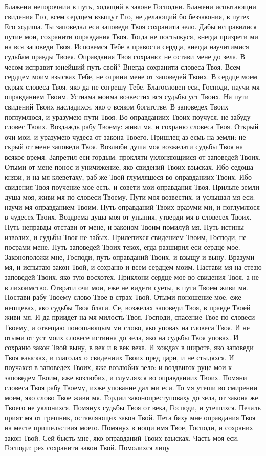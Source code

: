 \begin{mymulticols}
Блажени непорочнии в путь, ходящий в законе Господни. Блажени испытающии свидения Его, всем сердцем взыщут Его, не делающий бо беззакония, в путех Его ходиша. Ты заповедал еси заповеди Твоя сохранити зело. Дабы исправилися путие мои, сохранити оправдания Твоя. Тогда не постыжуся, внегда призрети ми на вся заповеди Твоя. Исповемся Тебе в правости сердца, внегда научитимися судьбам правды Твоея. Оправдания Твоя сохраню: не остави мене до зела. В чесом исправит юнейший путь свой? Внегда сохранити словеса Твоя. Всем сердцем моим взысках Тебе, не отрини мене от заповедей Твоих. В сердце моем скрых словеса Твоя, яко да не согрешу Тебе. Благословен еси, Господи, научи мя оправданием Твоим. Устнама моима возвестих вся судьбы уст Твоих. На пути свидений Твоих насладихся, яко о всяком богатстве. В заповедех Твоих поглумлюся, и уразумею пути Твоя. Во оправданиих Твоих поучуся, не забуду словес Твоих. Воздаждь рабу Твоему: живи мя, и сохраню словеса Твоя. Открый очи мои, и уразумею чудеса от закона Твоего. Пришлец аз есмь на земли: не скрый от мене заповеди Твоя. Возлюби душа моя возжелати судьбы Твоя на всякое время. Запретил еси гордым: прокляти уклоняющиися от заповедей Твоих. Отыми от мене понос и уничижение, яко свидений Твоих взысках. Ибо седоша князи, и на мя клеветаху, раб же Твой глумляшеся во оправданиих Твоих. Ибо свидения Твоя поучение мое есть, и совети мои оправдания Твоя. Прильпе земли душа моя, живи мя по словеси Твоему. Пути моя возвестих, и услышал мя еси: научи мя оправданием Твоим. Путь оправданий Твоих вразуми ми, и поглумлюся в чудесех Твоих. Воздрема душа моя от уныния, утверди мя в словесех Твоих. Путь неправды отстави от мене, и законом Твоим помилуй мя. Путь истины изволих, и судьбы Твоя не забых. Прилепихся свидением Твоим, Господи, не посрами мене. Путь заповедей Твоих текох, егда разширил еси сердце мое. Законоположи мне, Господи, путь оправданий Твоих, и взыщу и выну. Вразуми мя, и испытаю закон Твой, и сохраню и всем сердцем моим. Настави мя на стезю заповедей Твоих, яко тую восхотех. Приклони сердце мое во свидения Твоя, а не в лихоимство. Отврати очи мои, еже не видети суеты, в пути Твоем живи мя. Постави рабу Твоему слово Твое в страх Твой. Отыми поношение мое, еже непщевах, яко судьбы Твоя благи. Се, возжелах заповеди Твоя, в правде Твоей живи мя. И да приидет на мя милость Твоя, Господи, спасение Твое по словеси Твоему, и отвещаю поношающым ми слово, яко уповах на словеса Твоя. И не отыми от уст моих словесе истинна до зела, яко на судьбы Твоя уповах. И сохраню закон Твой выну, в век и в век века. И хождах в широте, яко заповеди Твоя взысках, и глаголах о свидениих Твоих пред цари, и не стыдяхся. И поучахся в заповедех Твоих, яже возлюбих зело: и воздвигох руце мои к заповедем Твоим, яже возлюбих, и глумляхся во оправданиих Твоих. Помяни словеса Твоя рабу Твоему, ихже упование дал ми еси. То мя утеши во смирении моем, яко слово Твое живи мя. Гордии законопреступоваху до зела, от закона же Твоего не уклонихся. Помянух судьбы Твоя от века, Господи, и утешихся. Печаль прият мя от грешник, оставляющих закон Твой. Пета бяху мне оправдания Твоя на месте пришельствия моего. Помянух в нощи имя Твое, Господи, и сохраних закон Твой. Сей бысть мне, яко оправданий Твоих взысках. Часть моя еси, Господи: рех сохранити закон Твой. Помолихся лицу 
\end{mymulticols}
